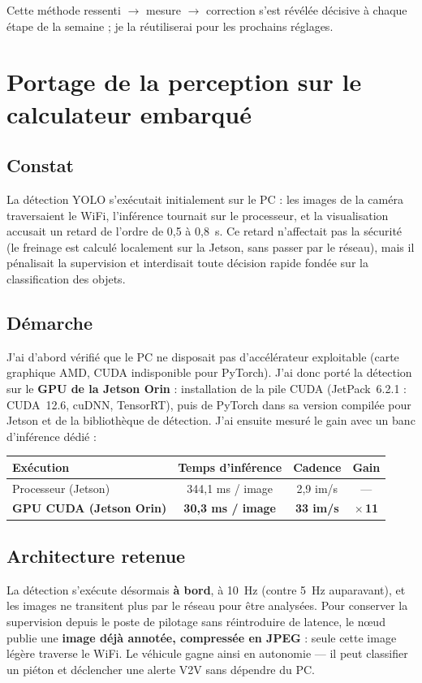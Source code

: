 \documentclass[11pt,a4paper]{article}
\begin{document}
Cette méthode ressenti $\rightarrow$ mesure $\rightarrow$ correction s'est révélée
décisive à chaque étape de la semaine ; je la réutiliserai pour les prochains
réglages.

\section{Portage de la perception sur le calculateur embarqué}
\subsection{Constat}
La détection YOLO s'exécutait initialement sur le PC : les images de la caméra
traversaient le WiFi, l'inférence tournait sur le processeur, et la visualisation
accusait un retard de l'ordre de 0,5 à 0,8~s. Ce retard n'affectait pas la sécurité
(le freinage est calculé localement sur la Jetson, sans passer par le réseau), mais
il pénalisait la supervision et interdisait toute décision rapide fondée sur la
classification des objets.

\subsection{Démarche}
J'ai d'abord vérifié que le PC ne disposait pas d'accélérateur exploitable (carte
graphique AMD, CUDA indisponible pour PyTorch). J'ai donc porté la détection sur le
\textbf{GPU de la Jetson Orin} : installation de la pile CUDA (JetPack~6.2.1 :
CUDA~12.6, cuDNN, TensorRT), puis de PyTorch dans sa version compilée pour Jetson et
de la bibliothèque de détection. J'ai ensuite mesuré le gain avec un banc
d'inférence dédié :

\begin{center}
\renewcommand{\arraystretch}{1.2}
\begin{tabular}{@{}lccc@{}}
\toprule
\textbf{Exécution} & \textbf{Temps d'inférence} & \textbf{Cadence} & \textbf{Gain} \\
\midrule
Processeur (Jetson) & 344,1 ms / image & 2,9 im/s & --- \\
\textbf{GPU CUDA (Jetson Orin)} & \textbf{30,3 ms / image} & \textbf{33 im/s} & $\times$\,\textbf{11} \\
\bottomrule
\end{tabular}
\end{center}

\subsection{Architecture retenue}
La détection s'exécute désormais \textbf{à bord}, à 10~Hz (contre 5~Hz auparavant),
et les images ne transitent plus par le réseau pour être analysées. Pour conserver la
supervision depuis le poste de pilotage sans réintroduire de latence, le nœud publie
une \textbf{image déjà annotée, compressée en JPEG} : seule cette image légère
traverse le WiFi. Le véhicule gagne ainsi en autonomie — il peut classifier un piéton
et déclencher une alerte V2V sans dépendre du PC.
\end{document}
